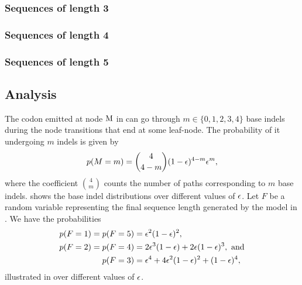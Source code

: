 \subsubsection{Sequences of length 3}

\subsubsection{Sequences of length 4}

\subsubsection{Sequences of length 5}

\subsection{Analysis}

The codon emitted at node $\mathrm{M}$ in  can go through $m\in\{0, 1, 2, 3,
4\}$ base indels during the node transitions that end at some leaf-node. The probability of
it undergoing $m$ indels is given by
\begin{equation*}
  p(M=m) = \binom{4}{4-m} (1 - \epsilon)^{4-m} \epsilon^m,
\end{equation*}
where the coefficient $\binom{4}{m}$ counts the number of paths corresponding to $m$ base indels.
 shows the base indel distributions over different values of $\epsilon$.
Let $F$ be a random variable representing the final sequence length generated by the model in
.
We have the probabilities
\begin{equation*}
  \begin{split}
    p(F=1) = p(F=5) &= \epsilon^2(1-\epsilon)^2, \\
    p(F=2) = p(F=4) &= 2\epsilon^3(1-\epsilon) + 2\epsilon(1-\epsilon)^3,~\text{and} \\
    p(F=3)          &= \epsilon^4 + 4\epsilon^2(1-\epsilon)^2 + (1-\epsilon)^4,
  \end{split}
\end{equation*}
illustrated in  over different values of $\epsilon$.


